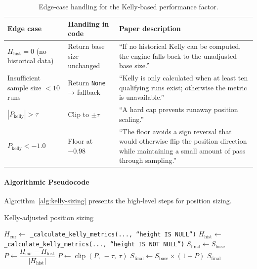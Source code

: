 \documentclass[10pt]{article}
\begin{document}
\begin{table}[t]
\small
\centering
\caption{Edge‑case handling for the Kelly‑based performance factor.}
\label{tab:edge-cases}
\begin{tabularx}{\textwidth}{@{} l l >{\raggedright\arraybackslash}X @{}}
\toprule
\textbf{Edge case} & \textbf{Handling in code} & \textbf{Paper description} \\
\midrule
$H_{\text{hist}} = 0$ (no historical data) & Return base size unchanged & “If no historical Kelly can be computed, the engine falls back to the unadjusted base size.” \\
Insufficient sample size $<10$ runs & Return \texttt{None} → fallback & “Kelly is only calculated when at least ten qualifying runs exist; otherwise the metric is unavailable.” \\
$|P_{\text{kelly}}| > \tau$ & Clip to $\pm\tau$ & “A hard cap prevents runaway position scaling.” \\
$P_{\text{kelly}} < -1.0$ & Floor at $-0.98$ & “The floor avoids a sign reversal that would otherwise flip the position direction while maintaining a small amount of pass through sampling.” \\
\bottomrule
\end{tabularx}
\end{table}

\paragraph{Algorithmic Pseudocode}
Algorithm~\ref{alg:kelly-sizing} presents the high‑level steps for position sizing.
\begin{algorithm}[H]
\caption{Kelly‑adjusted position sizing}
\label{alg:kelly-sizing}
\begin{algorithmic}
\State $H_{\text{cur}} \gets$ \texttt{\_calculate\_kelly\_metrics(..., ``height IS NULL'')}
\State $H_{\text{hist}} \gets$ \texttt{\_calculate\_kelly\_metrics(..., ``height IS NOT NULL'')}
    \State $S_{\text{final}} \gets S_{\text{base}}$
\Else
    \State $P \gets \dfrac{H_{\text{cur}} - H_{\text{hist}}}{\lvert H_{\text{hist}} \rvert}$
    \State $P \gets \operatorname{clip}(P,\ -\tau,\ \tau)$
    \State $S_{\text{final}} \gets S_{\text{base}} \times (1 + P)$
\EndIf
\State \Return $S_{\text{final}}$
\end{algorithmic}
\end{algorithm}
\end{document}
